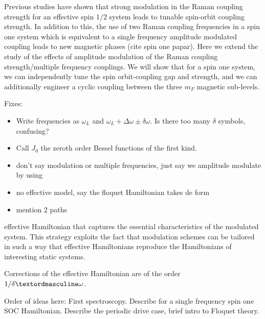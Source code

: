 Previous studies have shown that strong modulation in the Raman coupling strength for an effective spin $1/2$ system leads to tunable spin-orbit coupling strength. In addition to this, the use of two Raman coupling frequencies in a spin one system which is equivalent to a single frequency amplitude modulated coupling leads to new magnetic phases (cite spin one papar). Here we extend the study of the effects of amplitude modulation of the Raman coupling strength/multiple frequency couplings. We will show that for a spin one system, we can independently  tune the spin orbit-coupling gap and strength, and we can additionally engineer a cyclic coupling between the three $m_F$ magnetic sub-levels. 



Fixes:
\begin{itemize}
	\item Write frequencies as $\omega_L$ and $\omega_L +\Delta\omega \pm\delta\omega$. Is there too many $\delta$ symbols, confusing?
	\item Call $J_0$ the zeroth order Bessel functions of the first kind.
	\item don't say modulation or multiple frequencies, just say we amplitude modulate by using 
	\item no effective model, say the floquet Hamiltonian takes de form
	\item mention 2 paths
\end{itemize}


effective Hamiltonian that captures the essential characteristics
of the modulated system. This strategy exploits the
fact that modulation schemes can be tailored in such a way
that effective Hamiltonians reproduce the Hamiltonians
of interesting static systems.

Corrections of the effective Hamiltonian are of the order $1/\deltaº\omega$.

Order of ideas here:
First spectroscopy. Describe for a single frequency spin one SOC Hamiltonian. Describe the periodic drive case, brief intro to Floquet theory.  
 
